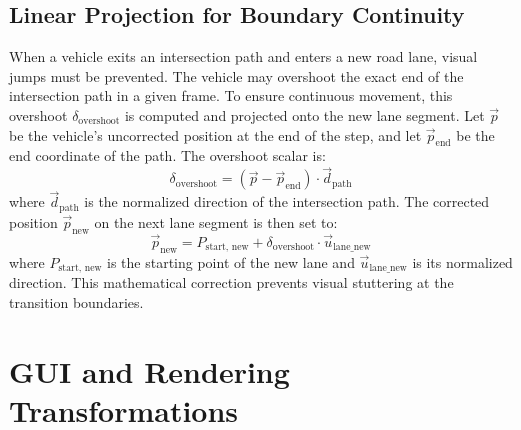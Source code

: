 \documentclass[../report_main.tex]{subfiles}
\begin{document}
\subsection{Linear Projection for Boundary Continuity}
When a vehicle exits an intersection path and enters a new road lane, visual jumps must be prevented. The vehicle may overshoot the exact end of the intersection path in a given frame. To ensure continuous movement, this overshoot $\delta_{\text{overshoot}}$ is computed and projected onto the new lane segment.
Let $\overrightarrow{p}$ be the vehicle's uncorrected position at the end of the step, and let $\overrightarrow{p}_{\text{end}}$ be the end coordinate of the path. The overshoot scalar is:
\begin{equation}
    \delta_{\text{overshoot}} = (\overrightarrow{p} - \overrightarrow{p}_{\text{end}}) \cdot \overrightarrow{d}_{\text{path}}
\end{equation}
where $\overrightarrow{d}_{\text{path}}$ is the normalized direction of the intersection path. The corrected position $\overrightarrow{p}_{\text{new}}$ on the next lane segment is then set to:
\begin{equation}
    \overrightarrow{p}_{\text{new}} = P_{\text{start, new}} + \delta_{\text{overshoot}} \cdot \overrightarrow{u}_{\text{lane\_new}}
\end{equation}
where $P_{\text{start, new}}$ is the starting point of the new lane and $\overrightarrow{u}_{\text{lane\_new}}$ is its normalized direction. This mathematical correction prevents visual stuttering at the transition boundaries.

\section{GUI and Rendering Transformations}
\end{document}
